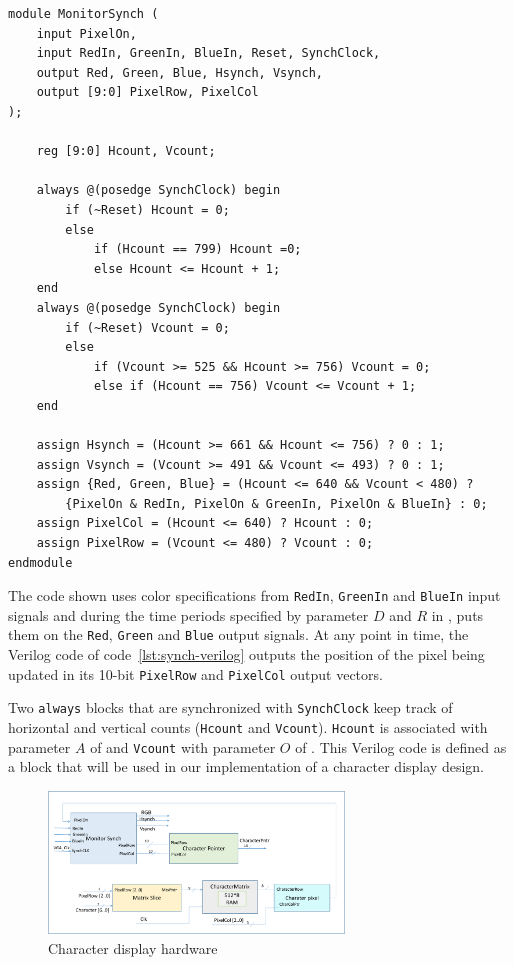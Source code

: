 \documentclass[12pt, logo=tehranDLDL/ut]{tehranDLDL}
\begin{document}
\begin{lstlisting}[caption={Monitor synchronization hardware\label{lst:synch-verilog}}]
module MonitorSynch (
    input PixelOn, 
    input RedIn, GreenIn, BlueIn, Reset, SynchClock, 
    output Red, Green, Blue, Hsynch, Vsynch,
    output [9:0] PixelRow, PixelCol
);

    reg [9:0] Hcount, Vcount;

    always @(posedge SynchClock) begin
        if (~Reset) Hcount = 0;
        else 
            if (Hcount == 799) Hcount =0; 
            else Hcount <= Hcount + 1;
    end
    always @(posedge SynchClock) begin
        if (~Reset) Vcount = 0;
        else 
            if (Vcount >= 525 && Hcount >= 756) Vcount = 0;
            else if (Hcount == 756) Vcount <= Vcount + 1;
    end

    assign Hsynch = (Hcount >= 661 && Hcount <= 756) ? 0 : 1;
    assign Vsynch = (Vcount >= 491 && Vcount <= 493) ? 0 : 1;
    assign {Red, Green, Blue} = (Hcount <= 640 && Vcount < 480) ? 
        {PixelOn & RedIn, PixelOn & GreenIn, PixelOn & BlueIn} : 0;
    assign PixelCol = (Hcount <= 640) ? Hcount : 0;
    assign PixelRow = (Vcount <= 480) ? Vcount : 0;
endmodule
\end{lstlisting}

The code shown uses color specifications from \lstinline{RedIn}, \lstinline{GreenIn} and \lstinline{BlueIn} input signals and during the time periods specified by parameter $D$ and $R$ in , puts them on the \lstinline{Red}, \lstinline{Green} and \lstinline{Blue} output signals. At any point in time, the Verilog code of code~\ref{lst:synch-verilog} outputs the position of the pixel being updated in its 10-bit \lstinline{PixelRow} and \lstinline{PixelCol} output vectors.

Two \lstinline{always} blocks that are synchronized with \lstinline{SynchClock} keep track of horizontal and vertical counts (\lstinline{Hcount} and \lstinline{Vcount}). \lstinline{Hcount} is associated with parameter $A$ of  and \lstinline{Vcount} with parameter $O$ of . This Verilog code is defined as a block that will be used in our implementation of a character display design.

\begin{figure}
    \centering
    \caption{Character display hardware\label{fig:char-display}}
    \includegraphics[width=0.7\textwidth]{char-display}
\end{figure}
\end{document}
